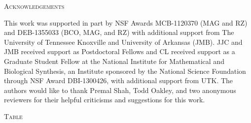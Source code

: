 \documentclass[12pt,letterpaper,fleqn]{article}
\renewcommand{\section}[1]{%
\bigskip
\begin{center}
\begin{Large}
\normalfont\scshape #1
\medskip
\end{Large}
\end{center}}
\begin{document}
\section{Acknowledgements}
This work was supported in part by NSF Awards MCB-1120370 (MAG and RZ) and DEB-1355033 (BCO, MAG, and RZ) with additional support from The University of Tennessee Knoxville and University of Arkansas (JMB).
JJC and JMB received support as Postdoctoral Fellows and CL received support as a Graduate Student Fellow at the National Institute for Mathematical and Biological Synthesis, an Institute sponsored by the National Science Foundation through NSF Award DBI-1300426, with additional support from UTK.
The authors would like to thank Premal Shah, Todd Oakley, and two anonymous reviewers for their helpful criticisms and suggestions for this work.
\clearpage




\renewcommand\refname{\begin{center}{\normalfont\scshape References}\end{center}}



\clearpage

\section{Table}
\end{document}
